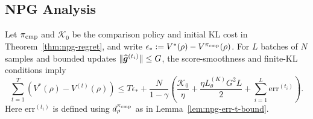 \subsection[Natural Policy Gradient Regret Analysis]{NPG Analysis}

\begin{lem}
Let $\pi_{\rm cmp}$ and $\mathcal K_0$ be the comparison policy and initial KL cost in Theorem~\ref{thm:npg-regret}, and write $\epsilon_*:=V^*(\rho)-V^{\pi_{\rm cmp}}(\rho)$. For $L$ batches of $N$ samples and bounded
updates $\|\widehat{\bm{g}}^{(t_i)}\|\leq G$, the score-smoothness and finite-KL
conditions imply
\[
\sum_{t=1}^T(V^*(\rho)-V^{(t)}(\rho))
\leq T\epsilon_*+\frac{N}{1-\gamma}
\left(\frac {\mathcal K_0}\eta+\frac{\eta L_\theta^{(K)}G^2L}{2}
+\sum_{i=1}^L\mathrm{err}^{(t_i)}\right).
\]
Here $\mathrm{err}^{(t_i)}$ is defined using $d_\rho^{\pi_{\rm cmp}}$ as in
Lemma~\ref{lem:npg-err-t-bound}.
\label{lem:npg-regret-lemma}
\end{lem}
